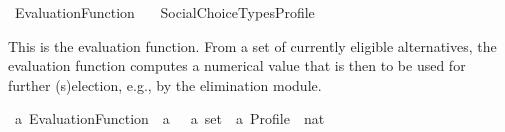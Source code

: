 %
\begin{isabellebody}%
%
%
\isadelimdocument
\isanewline
%
\endisadelimdocument
%
\isatagdocument
\isanewline
%
\isamarkuptrue%
%
\endisatagdocument
{\isafolddocument}%
%
\isadelimdocument
%
\endisadelimdocument
%
\isadelimtheory
%
\endisadelimtheory
%
\isatagtheory
{}\isamarkupfalse%
\ Evaluation{\isacharunderscore}{\kern0pt}Function\isanewline
\ \ \ {\isachardoublequoteopen}{\isachardot}{\kern0pt}{\isachardot}{\kern0pt}{\isacharslash}{\kern0pt}{\isachardot}{\kern0pt}{\isachardot}{\kern0pt}{\isacharslash}{\kern0pt}Social{\isacharunderscore}{\kern0pt}Choice{\isacharunderscore}{\kern0pt}Types{\isacharslash}{\kern0pt}Profile{\isachardoublequoteclose}\isanewline
{}%
\endisatagtheory
{\isafoldtheory}%
%
\isadelimtheory
%
\endisadelimtheory
%
\begin{isamarkuptext}%
This is the evaluation function. From a set of currently eligible alternatives,
the evaluation function computes a numerical value that is then to be used for
further (s)election, e.g., by the elimination module.%
\end{isamarkuptext}\isamarkuptrue%
%
\isadelimdocument
%
\endisadelimdocument
%
\isatagdocument
%
\isamarkuptrue%
%
\endisatagdocument
{\isafolddocument}%
%
\isadelimdocument
%
\endisadelimdocument
{}\isamarkupfalse%
\ {\isacharprime}{\kern0pt}a\ Evaluation{\isacharunderscore}{\kern0pt}Function\ {\isacharequal}{\kern0pt}\ {\isachardoublequoteopen}{\isacharprime}{\kern0pt}a\ \ {\isasymRightarrow}\ {\isacharprime}{\kern0pt}a\ set\ {\isasymRightarrow}\ {\isacharprime}{\kern0pt}a\ Profile\ {\isasymRightarrow}\ nat{\isachardoublequoteclose}\isanewline
%
\isadelimtheory
\isanewline
%
\endisadelimtheory
%
\isatagtheory
{}\isamarkupfalse%
%
\endisatagtheory
{\isafoldtheory}%
%
\isadelimtheory
%
\endisadelimtheory
%
\end{isabellebody}%
\endinput
